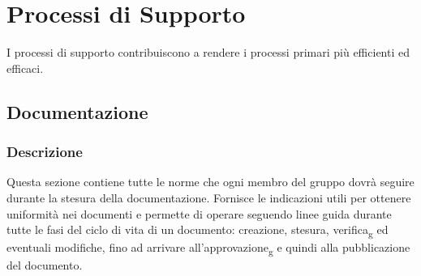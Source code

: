 \section{Processi di Supporto}
I processi di supporto contribuiscono a rendere i processi primari più
efficienti ed efficaci.
\subsection{Documentazione}
\subsubsection{Descrizione}
Questa sezione contiene tutte le norme che ogni membro del gruppo dovrà seguire
durante la stesura della documentazione. Fornisce le indicazioni utili per
ottenere uniformità nei documenti e permette di operare seguendo linee
guida durante tutte le fasi del ciclo di vita di un documento: creazione,
stesura, verifica\textsubscript{g} ed eventuali modifiche, fino ad arrivare
all'approvazione\textsubscript{g} e quindi alla pubblicazione del documento.
